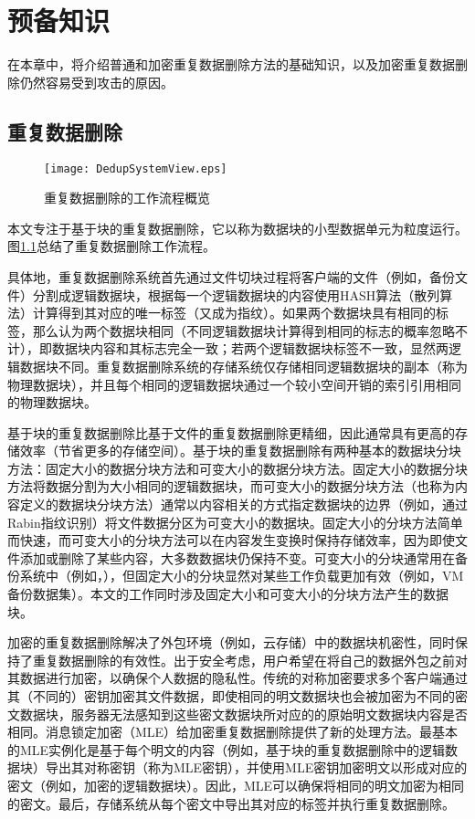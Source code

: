 \chapter{预备知识}

\label{sec:background}
在本章中，将介绍普通和加密重复数据删除方法的基础知识，以及加密重复数据删除仍然容易受到攻击的原因。

\section{重复数据删除}

\begin{figure}[!htb]
    \small
    \centering
    \texttt{[image: DedupSystemView.eps]}
    \caption{重复数据删除的工作流程概览} 
    \label{fig:重复数据删除的工作流程概览}
\end{figure}

本文专注于基于块的重复数据删除，它以称为数据块的小型数据单元为粒度运行。图\ref{fig:重复数据删除的工作流程概览}总结了重复数据删除工作流程。 

具体地，重复数据删除系统首先通过文件切块过程将客户端的文件（例如，备份文件）分割成逻辑数据块，根据每一个逻辑数据块的内容使用HASH算法（散列算法）计算得到其对应的唯一标签（又成为指纹）。如果两个数据块具有相同的标签，那么认为两个数据块相同（不同逻辑数据块计算得到相同的标志的概率忽略不计），即数据块内容和其标志完全一致；若两个逻辑数据块标签不一致，显然两逻辑数据块不同。重复数据删除系统的存储系统仅存储相同逻辑数据块的副本（称为物理数据块），并且每个相同的逻辑数据块通过一个较小空间开销的索引引用相同的物理数据块。  

基于块的重复数据删除比基于文件的重复数据删除更精细，因此通常具有更高的存储效率（节省更多的存储空间）。基于块的重复数据删除有两种基本的数据块分块方法：固定大小的数据分块方法和可变大小的数据分块方法。固定大小的数据分块方法将数据分割为大小相同的逻辑数据块，而可变大小的数据分块方法（也称为内容定义的数据块分块方法）通常以内容相关的方式指定数据块的边界（例如，通过Rabin指纹识别）将文件数据分区为可变大小的数据块。固定大小的分块方法简单而快速，而可变大小的分块方法可以在内容发生变换时保持存储效率，因为即使文件添加或删除了某些内容，大多数数据块仍保持不变。可变大小的分块通常用在备份系统中（例如，），但固定大小的分块显然对某些工作负载更加有效（例如，VM备份数据集）。本文的工作同时涉及固定大小和可变大小的分块方法产生的数据块。

加密的重复数据删除解决了外包环境（例如，云存储）中的数据块机密性，同时保持了重复数据删除的有效性。出于安全考虑，用户希望在将自己的数据外包之前对其数据进行加密，以确保个人数据的隐私性。传统的对称加密要求多个客户端通过其（不同的）密钥加密其文件数据，即使相同的明文数据块也会被加密为不同的密文数据块，服务器无法感知到这些密文数据块所对应的的原始明文数据块内容是否相同。消息锁定加密（MLE）给加密重复数据删除提供了新的处理方法。最基本的MLE实例化是基于每个明文的内容（例如，基于块的重复数据删除中的逻辑数据块）导出其对称密钥（称为MLE密钥），并使用MLE密钥加密明文以形成对应的密文（例如，加密的逻辑数据块）。因此，MLE可以确保将相同的明文加密为相同的密文。最后，存储系统从每个密文中导出其对应的标签并执行重复数据删除。

